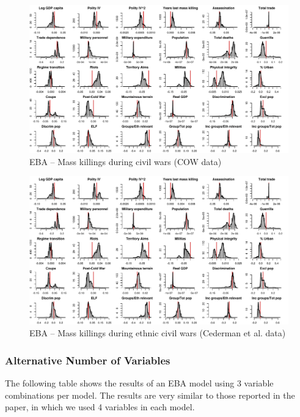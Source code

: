 \clearpage
\begin{figure}
    \centering
    \includegraphics[width=\textwidth]{images/mk-ucdp.pdf}
    \caption{EBA -- Mass killings during civil wars (COW data)}
    \label{fig:mk-cow}
\end{figure}
\clearpage

\clearpage
\begin{figure}
    \centering
    \includegraphics[width=\textwidth]{images/mk-ucdp.pdf}
    \caption{EBA -- Mass killings during ethnic civil wars (Cederman et al. data)}
    \label{fig:mk-eth}
\end{figure}
\clearpage

\subsubsection{Alternative Number of Variables}

The following table shows the results of an EBA model using 3 variable combinations per model. The results are very similar to those reported in the paper, in which we used 4 variables in each model.

